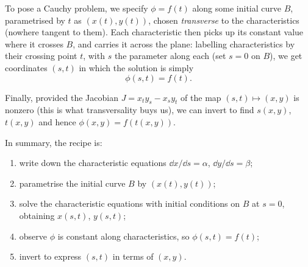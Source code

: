 To pose a Cauchy problem, we specify $\phi = f(t)$ along some initial curve $B$, parametrised by $t$ as $(x(t), y(t))$, chosen \emph{transverse} to the characteristics (nowhere tangent to them). Each characteristic then picks up its constant value where it crosses $B$, and carries it across the plane: labelling characteristics by their crossing point $t$, with $s$ the parameter along each (set $s = 0$ on $B$), we get coordinates $(s, t)$ in which the solution is simply
$$
\phi(s, t) = f(t).
$$

\begin{center}
\end{center}

Finally, provided the Jacobian $J = x_t y_s - x_s y_t$ of the map $(s,t) \mapsto (x,y)$ is nonzero (this is what transversality buys us), we can invert to find $s(x,y)$, $t(x,y)$ and hence $\phi(x, y) = f(t(x, y))$.

In summary, the recipe is:
\begin{enumerate}
    \item write down the characteristic equations $\dd x/\dd s = \alpha$, $\dd y/\dd s = \beta$;
    \item parametrise the initial curve $B$ by $(x(t), y(t))$;
    \item solve the characteristic equations with initial conditions on $B$ at $s = 0$, obtaining $x(s,t)$, $y(s, t)$;
    \item observe $\phi$ is constant along characteristics, so $\phi(s,t) = f(t)$;
    \item invert to express $(s, t)$ in terms of $(x, y)$.
\end{enumerate}

